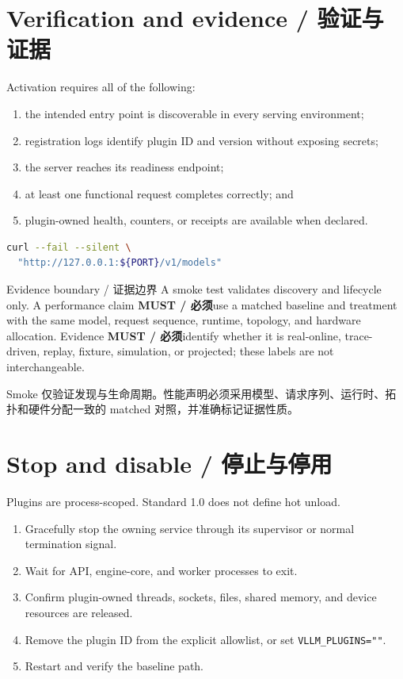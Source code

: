 \documentclass[11pt,a4paper,fontset=none]{ctexart}
\newcommand{\must}{\textbf{MUST / 必须}}
\begin{document}
\section{Verification and evidence / 验证与证据}

Activation requires all of the following:

\begin{enumerate}
  \item the intended entry point is discoverable in every serving environment;
  \item registration logs identify plugin ID and version without exposing secrets;
  \item the server reaches its readiness endpoint;
  \item at least one functional request completes correctly; and
  \item plugin-owned health, counters, or receipts are available when declared.
\end{enumerate}

\begin{lstlisting}[language=bash]
curl --fail --silent \
  "http://127.0.0.1:${PORT}/v1/models"
\end{lstlisting}

\begin{normative}{Evidence boundary / 证据边界}
  A smoke test validates discovery and lifecycle only. A performance claim \must use a matched
  baseline and treatment with the same model, request sequence, runtime, topology, and hardware
  allocation. Evidence \must identify whether it is real-online, trace-driven, replay, fixture,
  simulation, or projected; these labels are not interchangeable.

  Smoke 仅验证发现与生命周期。性能声明必须采用模型、请求序列、运行时、拓扑和硬件分配一致的
  matched 对照，并准确标记证据性质。
\end{normative}

\section{Stop and disable / 停止与停用}

Plugins are process-scoped. Standard 1.0 does not define hot unload.

\begin{enumerate}
  \item Gracefully stop the owning service through its supervisor or normal termination signal.
  \item Wait for API, engine-core, and worker processes to exit.
  \item Confirm plugin-owned threads, sockets, files, shared memory, and device resources are released.
  \item Remove the plugin ID from the explicit allowlist, or set \texttt{VLLM\_PLUGINS=""}.
  \item Restart and verify the baseline path.
\end{enumerate}
\end{document}
